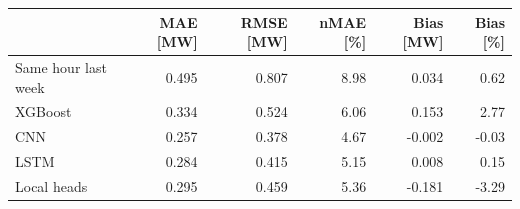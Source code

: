 \begin{tabular}{lrrrrr}
\toprule
 & MAE [MW] & RMSE [MW] & nMAE [\%] & Bias [MW] & Bias [\%] \\
\midrule
Same hour last week & 0.495 & 0.807 & 8.98 & 0.034 & 0.62 \\
XGBoost & 0.334 & 0.524 & 6.06 & 0.153 & 2.77 \\
CNN & 0.257 & 0.378 & 4.67 & -0.002 & -0.03 \\
LSTM & 0.284 & 0.415 & 5.15 & 0.008 & 0.15 \\
Local heads & 0.295 & 0.459 & 5.36 & -0.181 & -3.29 \\
\bottomrule
\end{tabular}
